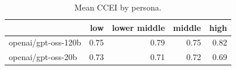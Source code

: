 \begin{table}[!htbp]\centering\small
\caption{Mean CCEI by persona.}\label{tab:ccei_by_persona}
\begin{tabular}{lrrrr}
\hline
 & low & lower middle & middle & high \\ \hline
openai/gpt-oss-120b & 0.75 & 0.79 & 0.75 & 0.82 \\
openai/gpt-oss-20b & 0.73 & 0.71 & 0.72 & 0.69 \\
\hline
\end{tabular}
\end{table}